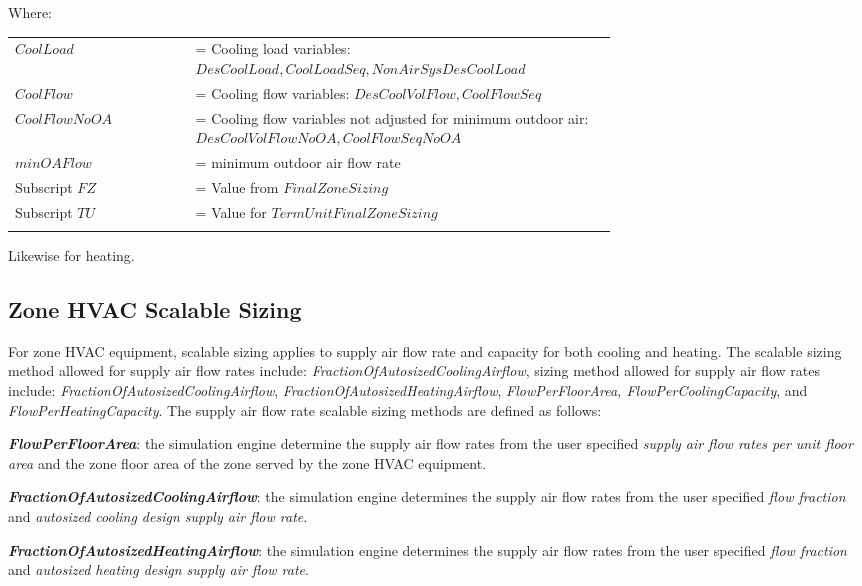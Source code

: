 Where:

\begin{tabular}{lp{0.7\linewidth}}
\\
    $CoolLoad$ &= Cooling load variables: $DesCoolLoad, CoolLoadSeq, NonAirSysDesCoolLoad$\\
    $CoolFlow$ &= Cooling flow variables: $DesCoolVolFlow, CoolFlowSeq$\\
    $CoolFlowNoOA$ &= Cooling flow variables not adjusted for minimum outdoor air: $DesCoolVolFlowNoOA, CoolFlowSeqNoOA$\\
    $minOAFlow$ &= minimum outdoor air flow rate\\
    Subscript $FZ$ &= Value from $FinalZoneSizing$\\
    Subscript $TU$ &= Value for $TermUnitFinalZoneSizing$\\
\\
\end{tabular}

Likewise for heating.

\subsection{Zone HVAC Scalable Sizing}\label{zone-hvac-scalable-sizing}

For zone HVAC equipment, scalable sizing applies to supply air flow rate and capacity for both cooling and heating. The scalable sizing method allowed for supply air flow rates include: \emph{FractionOfAutosizedCoolingAirflow}, sizing method allowed for supply air flow rates include: \emph{FractionOfAutosizedCoolingAirflow}, \emph{FractionOfAutosizedHeatingAirflow}, \emph{FlowPerFloorArea, FlowPerCoolingCapacity}, and \emph{FlowPerHeatingCapacity}. The supply air flow rate scalable sizing methods are defined as follows:

\textbf{\emph{FlowPerFloorArea}}: the simulation engine determine the supply air flow rates from the user specified \emph{supply air flow rates per unit floor area} and the zone floor area of the zone served by the zone HVAC equipment.

\textbf{\emph{FractionOfAutosizedCoolingAirflow}}: the simulation engine determines the supply air flow rates from the user specified \emph{flow fraction} and \emph{autosized cooling design supply air flow rate}.

\textbf{\emph{FractionOfAutosizedHeatingAirflow}}: the simulation engine determines the supply air flow rates from the user specified \emph{flow fraction} and \emph{autosized heating design supply air flow rate}.


